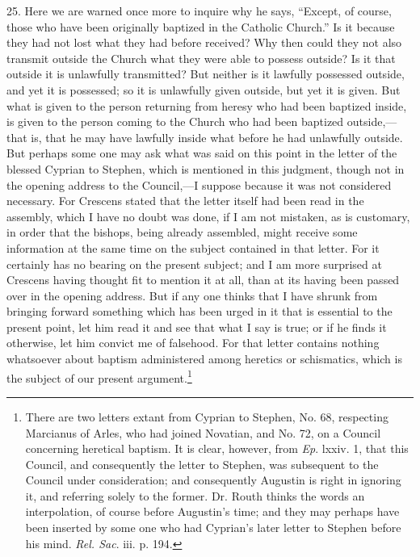 25. Here we are warned once more to inquire why he says, ``Except, of course, those who have been originally baptized in the Catholic Church.'' Is it because they had not lost what they had before received? Why then could they not also transmit outside the Church what they were able to possess outside? Is it that outside it is unlawfully transmitted? But neither is it lawfully possessed outside, and yet it is possessed; so it is unlawfully given outside, but yet it is given. But what is given to the person returning from heresy who had been baptized inside, is given to the person coming to the Church who had been baptized outside,—that is, that he may have lawfully inside what before he had unlawfully outside. But perhaps some one may ask what was said on this point in the letter of the blessed Cyprian to Stephen, which is mentioned in this judgment, though not in the opening address to the Council,—I suppose because it was not considered necessary. For Crescens stated that the letter itself had been read in the assembly, which I have no doubt was done, if I am not mistaken, as is customary, in order that the bishops, being already assembled, might receive some information at the same time on the subject contained in that letter. For it certainly has no bearing on the present subject; and I am more surprised at Crescens having thought fit to mention it at all, than at its having been passed over in the opening address. But if any one thinks that I have shrunk from bringing forward something which has been urged in it that is essential to the present point, let him read it and see that what I say is true; or if he finds it otherwise, let him convict me of falsehood. For that letter contains nothing whatsoever about baptism administered among heretics or schismatics, which is the subject of our present argument.\footnote{\par  There are two letters extant from Cyprian to Stephen, No. 68, respecting Marcianus of Arles, who had joined Novatian, and No. 72, on a Council concerning heretical baptism. It is clear, however, from \emph{Ep}. lxxiv. 1, that this Council, and consequently the letter to Stephen, was subsequent to the Council under consideration; and consequently Augustin is right in ignoring it, and referring solely to the former. Dr. Routh thinks the words an interpolation, of course before Augustin’s time; and they may perhaps have been inserted by some one who had Cyprian’s later letter to Stephen before his mind. \emph{Rel. Sac}. iii. p. 194.}


